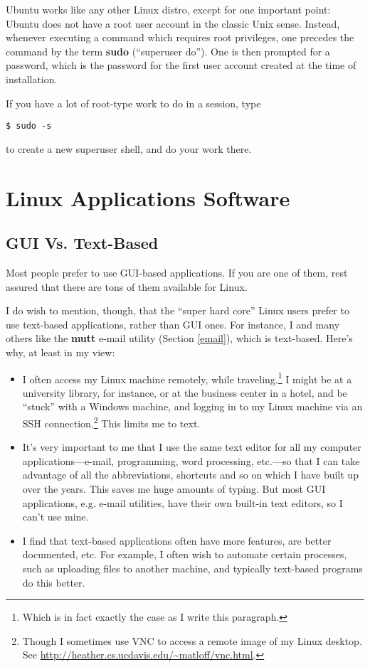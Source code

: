 \documentclass[11pt]{article}
\begin{document}
Ubuntu works like any other Linux distro, except for one important
point:  Ubuntu does not have a root user account in the classic Unix
sense.  Instead, whenever executing a command which requires root
privileges, one precedes the command by the term {\bf sudo} (``superuser
do'').  One is then prompted for a password, which is the password for
the first user account created at the time of installation.

If you have a lot of root-type work to do in a session, type

\begin{Verbatim}[fontsize=\relsize{-2}]
$ sudo -s
\end{Verbatim}

to create a new superuser shell, and do your work there.

\section{Linux Applications Software}

\subsection{GUI Vs. Text-Based}

Most people prefer to use GUI-based applications.  If you are one of
them, rest assured that there are tons of them available for Linux.

I do wish to mention, though, that the ``super hard core'' Linux users
prefer to use text-based applications, rather than GUI ones.  For
instance, I and many others like the {\bf mutt} e-mail utility (Section
\ref{email}), which is text-based.  Here's why, at least in my view:

\begin{itemize}

\item I often access my Linux machine remotely, while
traveling.\footnote{Which is in fact exactly the case as I write this
paragraph.}  I might be at a university library, for instance, or at the
business center in a hotel, and be ``stuck'' with a Windows machine, and
logging in to my Linux machine via an SSH connection.\footnote{Though I
sometimes use VNC to access a remote image of my Linux desktop.  See
\url{http://heather.cs.ucdavis.edu/~matloff/vnc.html}.}  This limits me
to text.

\item It's very important to me that I use the same text editor for all
my computer applications---e-mail, programming, word processing,
etc.---so that I can take advantage of all the abbreviations, shortcuts
and so on which I have built up over the years.  This saves me huge
amounts of typing.  But most GUI applications, e.g. e-mail utilities,
have their own built-in text editors, so I can't use mine.

\item I find that text-based applications often have more features, are
better documented, etc.  For example, I often wish to automate certain
processes, such as uploading files to another machine, and typically
text-based programs do this better.

\end{itemize}
\end{document}
